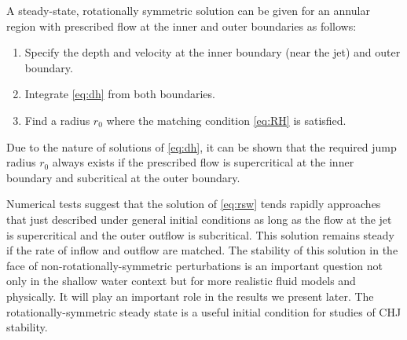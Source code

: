 \documentclass[preprint, 11pt]{article}
\begin{document}
A steady-state, rotationally symmetric solution can be given for an annular region with prescribed
flow at the inner and outer boundaries as follows:

\begin{enumerate}
    \item Specify the depth and velocity at the inner boundary (near the jet) and outer boundary.
    \item Integrate \eqref{eq:dh} from both boundaries.
    \item Find a radius $r_0$ where the matching condition \eqref{eq:RH} is satisfied.
\end{enumerate}
Due to the nature of solutions of \eqref{eq:dh}, it can be shown that the required jump
radius $r_0$ always exists if the prescribed flow is supercritical at the inner boundary
and subcritical at the outer boundary.

Numerical tests suggest that the solution of \eqref{eq:rsw} tends rapidly approaches that
just described under general initial conditions as long as the flow at the jet is
supercritical and the outer outflow is subcritical.  This solution remains steady
if the rate of inflow and outflow are matched.  The stability of this solution in
the face of non-rotationally-symmetric perturbations is an important question not
only in the shallow water context but for more realistic fluid models and physically.
It will play an important role in the results we present later.
The rotationally-symmetric steady state is a useful initial condition for studies
of CHJ stability.
\end{document}
